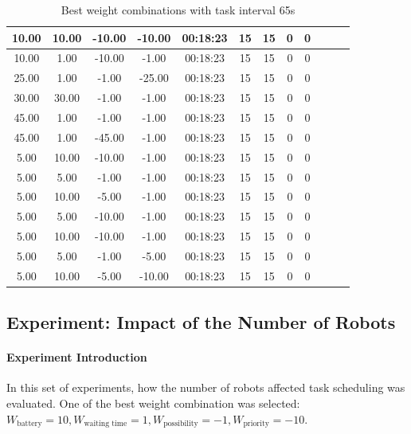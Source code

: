 \begin{table}[htb]
{\begin{tabular}{|c|c|c|c|c|c|c|c|c|c|c|c|}
10.00   & 10.00    & -10.00  & -10.00  & 00:18:23 & 15    & 15  & 0  & 0    \\ \hline
10.00   & 1.00     & -10.00  & -1.00   & 00:18:23 & 15    & 15  & 0  & 0    \\ \hline
25.00   & 1.00     & -1.00   & -25.00  & 00:18:23 & 15    & 15  & 0  & 0    \\ \hline
30.00   & 30.00    & -1.00   & -1.00   & 00:18:23 & 15    & 15  & 0  & 0    \\ \hline
45.00   & 1.00     & -1.00   & -1.00   & 00:18:23 & 15    & 15  & 0  & 0    \\ \hline
45.00   & 1.00     & -45.00  & -1.00   & 00:18:23 & 15    & 15  & 0  & 0    \\ \hline
5.00    & 10.00    & -10.00  & -1.00   & 00:18:23 & 15    & 15  & 0  & 0    \\ \hline
5.00    & 5.00     & -1.00   & -1.00   & 00:18:23 & 15    & 15  & 0  & 0   \\ \hline
5.00    & 10.00    & -5.00   & -1.00   & 00:18:23 & 15    & 15  & 0  & 0    \\ \hline
5.00    & 5.00     & -10.00  & -1.00   & 00:18:23 & 15    & 15  & 0  & 0   \\ \hline
5.00    & 10.00    & -10.00  & -1.00   & 00:18:23 & 15    & 15  & 0  & 0    \\ \hline
5.00    & 5.00     & -1.00   & -5.00   & 00:18:23 & 15    & 15  & 0  & 0    \\ \hline
5.00    & 10.00    & -5.00   & -10.00  & 00:18:23 & 15    & 15  & 0  & 0    \\ \hline
\end{tabular}}
\caption{Best weight combinations with task interval 65s}
\label{tab:exp_task_65s}
\end{table}


\subsection{Experiment: Impact of the Number of Robots}

\paragraph{Experiment Introduction} 
In this set of experiments, how the number of robots affected task scheduling was evaluated. One of the best weight combination was selected: $ W_{\mbox{battery}} = 10,W_{\mbox{waiting time}} = 1,  W_{\mbox{possibility}} = -1, W_{\mbox{priority}} = -10 $. 
    
